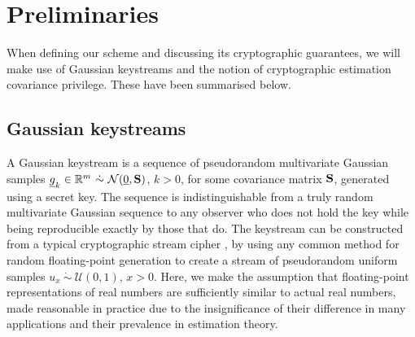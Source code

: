 \documentclass[conference]{IEEEtran}
\theoremstyle{definition}
\theoremstyle{remark}
\begin{document}
% 
%                                                                 
%                                                                 
%                                                                 
% 

\section{Preliminaries}\label{sec:prelim}
When defining our scheme and discussing its cryptographic guarantees, we will make use of Gaussian keystreams and the notion of cryptographic estimation covariance privilege. These have been summarised below.

% 
% 

\subsection{Gaussian keystreams}\label{subsec:gauss_keystreams}
A Gaussian keystream is a sequence of pseudorandom multivariate Gaussian samples $\vec{g}_k\in\mathbb{R}^m\ \dot{\sim}\ \mathcal{N}(\vec{0},\mat{S})$, $k>0$, for some covariance matrix ${{\mathbf{S}}}$, generated using a secret key. The sequence is indistinguishable from a truly random multivariate Gaussian sequence to any observer who does not hold the key while being reproducible exactly by those that do. The keystream can be constructed from a typical cryptographic stream cipher \cite[Ch. 3.6]{katzIntroductionModernCryptography2008}, by using any common method for random floating-point generation \cite{goualardGeneratingRandomFloatingPoint2020} to create a stream of pseudorandom uniform samples $u_x\ \dot{\sim}\ \mathcal{U}(0,1)$, $x>0$. Here, we make the assumption that floating-point representations of real numbers are sufficiently similar to actual real numbers, made reasonable in practice due to the insignificance of their difference in many applications and their prevalence in estimation theory.
\end{document}
